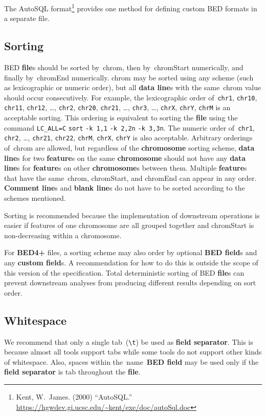 \documentclass[11pt]{article}
\providecommand*{\Ac}[1]{\ac{#1}} %
\begin{document}
The AutoSQL format\footnote{Kent, W.~James.
  (2000) ``AutoSQL.''
  \url{https://hgwdev.gi.ucsc.edu/~kent/exe/doc/autoSql.doc}} provides one method for defining custom \ac{BED} formats in a separate file.

\subsection{Sorting}
\Ac{BED} \textbf{file}s should be sorted by~\textsf{chrom}, then by~\textsf{chromStart} numerically, and finally by~\textsf{chromEnd} numerically.
\textsf{chrom} may be sorted using any scheme (such as lexicographic or numeric order), but all \textbf{data line}s with the same~\textsf{chrom} value should occur consecutively.
For example, the lexicographic order of~\texttt{chr1}, \texttt{chr10}, \texttt{chr11}, \texttt{chr12}, {\ldots}, \texttt{chr2}, \texttt{chr20}, \texttt{chr21}, {\ldots}, \texttt{chr3}, {\ldots}, \texttt{chrX}, \texttt{chrY}, \texttt{chrM} is an acceptable sorting.
This ordering is equivalent to sorting the \textbf{file} using the command \verb|LC_ALL=C| \verb|sort| \verb|-k 1,1| \verb|-k 2,2n| \verb|-k 3,3n|.
The numeric order of~\texttt{chr1}, \texttt{chr2}, {\ldots}, \texttt{chr21}, \texttt{chr22}, \texttt{chrM}, \texttt{chrX}, \texttt{chrY} is also acceptable.
Arbitrary orderings of~\textsf{chrom} are allowed, but regardless of the \textbf{chromosome} sorting scheme, \textbf{data line}s for two \textbf{feature}s on the same \textbf{chromosome} should not have any \textbf{data line}s for \textbf{feature}s on other \textbf{chromosome}s between them.
Multiple \textbf{feature}s that have the same~\textsf{chrom}, \textsf{chromStart}, and \textsf{chromEnd} can appear in any order.
\textbf{Comment line}s and \textbf{blank line}s do not have to be sorted according to the schemes mentioned.

Sorting is recommended because the implementation of downstream operations is easier if features of one chromosome are all grouped together and \textsf{chromStart} is non-decreasing within a chromosome.

For \textbf{BED4+} files, a sorting scheme may also order by optional \textbf{\acs{BED} field}s and any \textbf{custom field}s.
A recommendation for how to do this is outside the scope of this version of the specification.
Total deterministic sorting of \ac{BED} \textbf{file}s can prevent downstream analyses from producing different results depending on sort order.

\subsection{Whitespace}\label{sec:whitespace}
We recommend that only a single tab~(\texttt{{\textbackslash}t}) be used as \textbf{field separator}.
This is because almost all tools support tabs while some tools do not support other kinds of whitespace.
Also, spaces within the~\textsf{name}~\textbf{\acs{BED} field} may be used only if the \textbf{field separator} is tab throughout the \textbf{file}.
\end{document}
